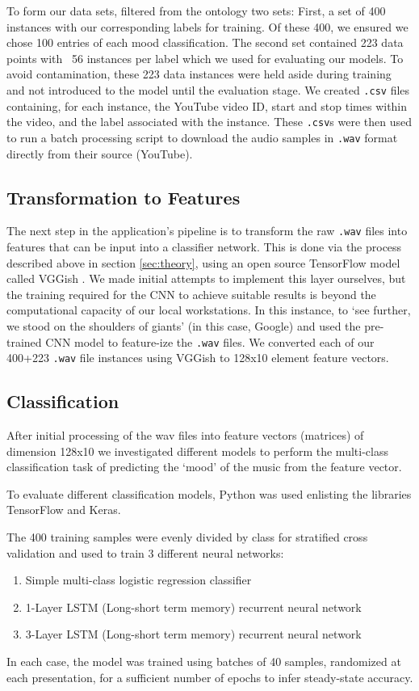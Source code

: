 \documentclass{article}
\begin{document}
To form our data sets, filtered from the ontology two sets: First, a set of 400 instances with our corresponding labels for training. Of these 400, we ensured we chose 100 entries of each mood classification. The second set contained 223 data points with ~56 instances per label which we used for evaluating our models. To avoid contamination, these 223 data instances were held aside during training and not introduced to the model until the evaluation stage. We created \texttt{.csv} files containing, for each instance, the YouTube video ID, start and stop times within the video, and the label associated with the instance. These \texttt{.csv}s were then used to run a batch processing script to download the audio samples in \texttt{.wav} format directly from their source (YouTube).

\subsection{Transformation to Features}
The next step in the application’s pipeline is to transform the raw \texttt{.wav} files into features that can be input into a classifier network. This is done via the process described above in section \ref{sec:theory}, using an open source TensorFlow model called VGGish \cite{vggish}. We made initial attempts to implement this layer ourselves, but the training required for the CNN to achieve suitable results is beyond the computational capacity of our local workstations. In this instance, to ‘see further, we stood on the shoulders of giants\cite{newton}’ (in this case, Google) and used the pre-trained CNN model to feature-ize the \texttt{.wav} files. We converted each of our 400+223 \texttt{.wav} file instances using VGGish to 128x10 element feature vectors.

\subsection{Classification}

After initial processing of the wav files into feature vectors (matrices) of dimension 128x10 we investigated different models to perform the multi-class classification task of predicting the ‘mood’ of the music from the feature vector.

To evaluate different classification models, Python was used enlisting the libraries TensorFlow\cite{tensorflow} and Keras\cite{keras}.

The 400 training samples were evenly divided by class for stratified cross validation and used to train 3 different neural networks:
\begin{enumerate}
\item Simple multi-class logistic regression classifier
\item 1-Layer LSTM (Long-short term memory) recurrent neural network
\item 3-Layer LSTM (Long-short term memory) recurrent neural network
\end{enumerate}
In each case, the model was trained using batches of 40 samples, randomized at each presentation, for a sufficient number of epochs to infer steady-state accuracy.
\end{document}
